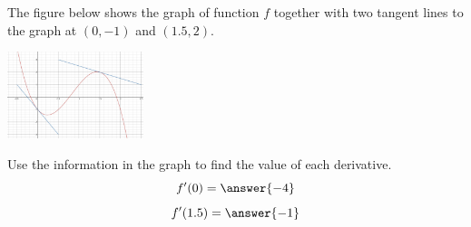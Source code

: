 \documentclass{ximera}
\begin{document}
 \begin{problem}\label{prob:240hom3prob3}
 The figure below shows the graph of function $f$ together with two tangent lines to the graph at $(0, -1)$ and $(1.5,2)$.
 \begin{image}
   \includegraphics[height=1in]{240H3pic1.jpg}
 \end{image}
 Use the information in the graph to find the value of each derivative.
 $$f'(0)=\answer{-4}$$
 $$f'(1.5)=\answer{-1}$$
 
 \end{problem}
 
 
\end{document}
